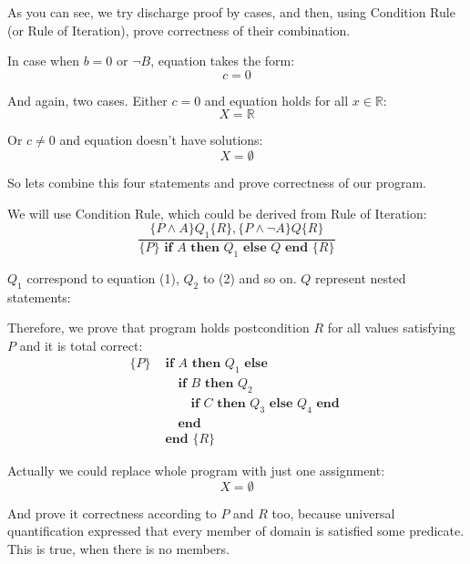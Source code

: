 \documentclass[twoside,twocolumn]{article}
\begin{document}
As you can see, we try discharge proof by cases, and then, using Condition
Rule (or Rule of Iteration), prove correctness of their combination.

In case when $b = 0$ or $\neg B$, equation takes the form:
$$ c = 0$$

And again, two cases. Either $c = 0$ and equation holds for all
$x \in \mathbb{R}$:
\begin{equation}
  X = \mathbb{R}
\end{equation}

Or $c \neq 0$ and equation doesn't have solutions:
\begin{equation}
  X = \emptyset
\end{equation}

So lets combine this four statements and prove correctness of our program.

We will use Condition Rule, which could be derived from Rule of Iteration:
$$\frac{\{P \wedge A\} Q_1 \{R\}, \{P \wedge \neg A\} Q \{R\}}
{\{P\} \textbf{ if } A \textbf{ then } Q_1 \textbf{ else } Q \textbf{ end } \{R\}}$$

$Q_1$ correspond to equation (1), $Q_2$ to (2) and so on. $Q$ represent
nested statements:


Therefore, we prove that program holds postcondition $R$ for all values
satisfying $P$ and it is total correct:
\begin{align*}
  \{P\} & \textbf{ if } A \textbf{ then } Q_1 \textbf{ else } \\
        & \hspace{1em} \textbf{ if } B \textbf{ then } Q_2 \\
        & \hspace{2em} \textbf{ if } C \textbf{ then } Q_3 \textbf { else } Q_4 \textbf { end } \\
        & \hspace{1em} \textbf{ end }\\
        & \textbf{ end } \{R\}
\end{align*}

\rightline{{\rm $\Box$}}


Actually we could replace whole program with just one assignment:
$$ X = \emptyset $$

And prove it correctness according to $P$ and $R$ too, because universal
quantification expressed that every member of domain is satisfied some
predicate. This is true, when there is no members.
\end{document}
